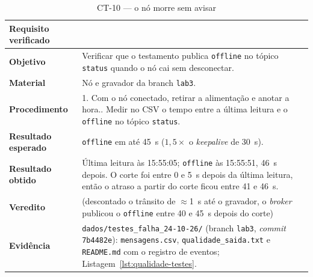 \begin{table}[H]
\centering
\caption{CT-10 --- o nó morre sem avisar}
\label{tab:ct10}
\footnotesize
\setlength{\tabcolsep}{3.5pt}
\begin{tabular}{@{}L{3.2cm}L{12.0cm}@{}}
\toprule
\textbf{Requisito verificado} &  \\
\midrule
\textbf{Objetivo} & Verificar que o testamento publica \texttt{offline} no tópico \texttt{status} quando o nó cai sem desconectar. \\
\textbf{Material} & Nó e gravador da branch \texttt{lab3}. \\
\textbf{Procedimento} &
  1. Com o nó conectado, retirar a alimentação e anotar a hora.. Medir no CSV o tempo entre a última leitura e o \texttt{offline} no tópico \texttt{status}. \\
\textbf{Resultado esperado} & \texttt{offline} em até \SI{45}{\second} ($1{,}5 \times$ o \emph{keepalive} de \SI{30}{\second}). \\
\textbf{Resultado obtido} & Última leitura às 15:55:05; \texttt{offline} às 15:55:51, \SI{46}{\second} depois. O corte foi entre 0 e \SI{5}{\second} depois da última leitura, então o atraso a partir do corte ficou entre 41 e \SI{46}{\second}. \\
\textbf{Veredito} & \aprovado{} (descontado o trânsito de $\approx$\SI{1}{\second} até o gravador, o \emph{broker} publicou o \texttt{offline} entre 40 e \SI{45}{\second} depois do corte) \\
\textbf{Evidência} & \texttt{dados/testes\_falha\_24-10-26/} (branch \texttt{lab3}, \emph{commit} \texttt{7b4482e}): \texttt{mensagens.csv}, \texttt{qualidade\_saida.txt} e \texttt{README.md} com o registro de eventos; Listagem~\ref{lst:qualidade-testes}. \\
\bottomrule
\end{tabular}
\end{table}

